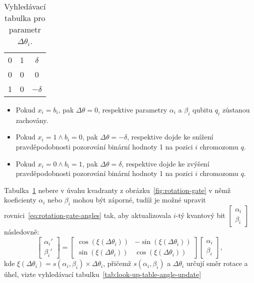 \begin{enumerate}
\begin{table}[ht!]
\begin{tabular}{|c c|c|}
            0     & 1     & $\delta$              \\ 
            0     & 0     & 0                \\ 
            1     & 0     & $-\delta$             \\
            \hline
            \end{tabular}
            \caption{Vyhledávací tabulka pro parametr $\Delta\theta_i$.}
            \label{tab:look-up-table-Delta}
        \end{table}
        \begin{itemize}
            \item Pokud $x_i = b_i$, pak $\Delta \theta = 0$, respektive parametry $\alpha_i$ a $\beta_i$ qubitu $q_i$ zůstanou zachovány.
            \item Pokud $x_i = 1 \wedge b_i = 0$, pak $\Delta \theta = -\delta$, respektive dojde ke snížení pravděpodobnosti pozorování binární hodnoty 1 na pozici $i$ chromozomu $q$. 
            \item Pokud $x_i = 0 \wedge b_i = 1$, pak $\Delta \theta =  \delta$, respektive dojde ke zvýšení pravděpodobnosti pozorování binární hodnoty 1 na pozici $i$ chromozomu $q$. 
        \end{itemize}
        Tabulka~\ref{tab:look-up-table-Delta} nebere v úvahu kvadranty z obrázku~\ref{fig:rotation-gate} v němž koeficienty $\alpha_i$ nebo $\beta_i$ mohou být záporné, tudíž je možné upravit rovnici~\ref{eq:rotation-gate-angles} tak, aby aktualizovala $i$-tý kvantový bit $\begin{bmatrix} \alpha_i \\ \beta_i \end{bmatrix}$ následovně:
        \begin{equation}\label{eq:rotation-gate-angles-update}
            \begin{bmatrix}
                \alpha_i' \\
                \beta_i' 
            \end{bmatrix}
            =
            \begin{bmatrix}
                \cos{\left( \xi \left( \Delta\theta_i \right) \right)} & - \sin{\left( \xi \left( \Delta\theta_i \right) \right)} \\
                \sin{\left( \xi \left( \Delta\theta_i \right) \right)} &   \cos{\left( \xi \left( \Delta\theta_i \right) \right)}
            \end{bmatrix}
            \begin{bmatrix}
                \alpha_i \\
                \beta_i 
            \end{bmatrix},
        \end{equation}
        kde $\xi \left( \Delta\theta_i \right) = s\left( \alpha_i , \beta_i \right) \times \Delta\theta_i $, přičemž $s\left( \alpha_i , \beta_i \right)$ a $\Delta\theta_i$ určují směr rotace a úhel, vizte vyhledávací tabulku~\ref{tab:look-up-table-angle-update}


\end{enumerate}
